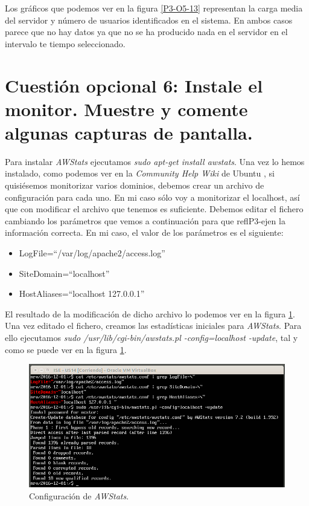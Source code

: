 \documentclass[a4paper,titlepage,12pt]{report}	%
\numberwithin{figure}{section} %
\numberwithin{table}{section} %
\begin{document}
	Los gráficos que podemos ver en la figura \ref{P3-O5-13} representan la carga media del servidor y número de usuarios identificados en el sistema. En ambos casos parece que no hay datos ya que no se ha producido nada en el servidor en el intervalo te tiempo seleccionado.

	\section[Cuestión opcional 6: Instale el monitor. Muestre y comente algunas capturas de pantalla.]{Cuestión opcional 6: Instale el monitor. Muestre y comente algunas capturas de pantalla.}

	Para instalar \textit{AWStats} ejecutamos \textit{sudo apt-get install awstats}. Una vez lo hemos instalado, como podemos ver en la \textit{Community Help Wiki} de Ubuntu \cite{awstats_instalacion}, si quisiésemos monitorizar varios dominios, debemos crear un archivo de configuración para cada uno. En mi caso sólo voy a monitorizar el localhost, así que con modificar el archivo que tenemos es suficiente. Debemos editar el fichero cambiando los parámetros que vemos a continuación para que reflP3-ejen la información correcta. En mi caso, el valor de los parámetros es el siguiente:
	\begin{itemize}
	   \item LogFile=``/var/log/apache2/access.log''
	   \item SiteDomain=``localhost''
	   \item HostAliases=``localhost 127.0.0.1''
	\end{itemize}

	El resultado de la modificación de dicho archivo lo podemos ver en la figura \ref{P3-O6-1}. Una vez editado el fichero, creamos las estadísticas iniciales para \textit{AWStats}. Para ello ejecutamos \textit{sudo /usr/lib/cgi-bin/awstats.pl -config=localhost -update}, tal y como se puede ver en la figura \ref{P3-O6-1}.

	\begin{figure}[H]
	   \includegraphics[width=\linewidth]{./Imagenes/P3/O6-1.png}
	   \vspace{-0.5cm}
	   \caption[Configuración de \textit{AWStats}.]{Configuración de \textit{AWStats}.}
	   \label{P3-O6-1}
	\end{figure}
\end{document}
